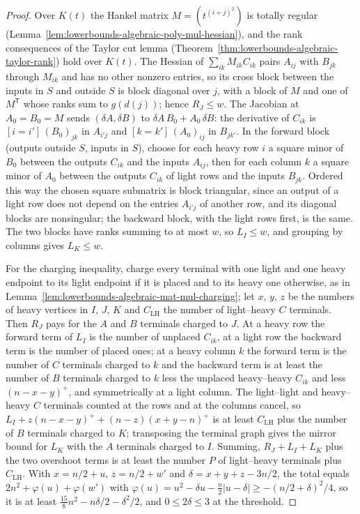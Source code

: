 \begin{proof}
  \leanok
  Over $K(t)$ the Hankel matrix $M=(t^{(i+j)^2})$ is totally regular
  (Lemma~\ref{lem:lowerbounds-algebraic-poly-mul-hessian}), and the rank
  consequences of the Taylor cut lemma
  (Theorem~\ref{thm:lowerbounds-algebraic-taylor-rank}) hold over $K(t)$.
  The Hessian of $\sum_{ik}M_{ik}C_{ik}$ pairs $A_{ij}$ with $B_{jk}$ through
  $M_{ik}$ and has no other nonzero entries, so its cross block between the
  inputs in $S$ and outside $S$ is block diagonal over $j$, with a block of
  $M$ and one of $M^{\mathsf T}$ whose ranks sum to $g(d(j))$; hence
  $R_J\le w$. The Jacobian at $A_0=B_0=M$ sends $(\delta A,\delta B)$ to
  $\delta A\,B_0+A_0\,\delta B$: the derivative of $C_{ik}$ is
  $[i=i']\,(B_0)_{jk}$ in $A_{i'j}$ and $[k=k']\,(A_0)_{ij}$ in $B_{jk'}$.
  In the forward block (outputs outside $S$, inputs in $S$), choose for each
  heavy row $i$ a square minor of $B_0$ between the outputs $C_{ik}$ and the
  inputs $A_{ij}$, then for each column $k$ a square minor of $A_0$ between
  the outputs $C_{ik}$ of light rows and the inputs $B_{jk}$. Ordered this
  way the chosen square submatrix is block triangular, since an output of a
  light row does not depend on the entries $A_{i'j}$ of another row, and its
  diagonal blocks are nonsingular; the backward block, with the light rows
  first, is the same. The two blocks have ranks summing to at most $w$, so
  $L_I\le w$, and grouping by columns gives $L_K\le w$.

  For the charging inequality, charge every terminal with one light and one
  heavy endpoint to its light endpoint if it is placed and to its heavy one
  otherwise, as in Lemma~\ref{lem:lowerbounds-algebraic-mat-mul-charging};
  let $x$, $y$, $z$ be the numbers of heavy vertices in $I$, $J$, $K$ and
  $C_{\mathrm{LH}}$ the number of light--heavy $C$ terminals. Then $R_J$ pays
  for the $A$ and $B$ terminals charged to $J$. At a heavy row the forward
  term of $L_I$ is the number of unplaced $C_{ik}$, at a light row the
  backward term is the number of placed ones; at a heavy column $k$ the
  forward term is the number of $C$ terminals charged to $k$ and the backward
  term is at least the number of $B$ terminals charged to $k$ less the
  unplaced heavy--heavy $C_{ik}$ and less $(n-x-y)^+$, and symmetrically at a
  light column. The light--light and heavy--heavy $C$ terminals counted at
  the rows and at the columns cancel, so
  $L_I+z(n-x-y)^++(n-z)(x+y-n)^+$ is at least $C_{\mathrm{LH}}$ plus the
  number of $B$ terminals charged to $K$; transposing the terminal graph
  gives the mirror bound for $L_K$ with the $A$ terminals charged to $I$.
  Summing, $R_J+L_I+L_K$ plus the two overshoot terms is at least the number
  $P$ of light--heavy terminals plus $C_{\mathrm{LH}}$. With
  $x=n/2+u$, $z=n/2+w'$ and $\delta=x+y+z-3n/2$, the total equals
  $2n^2+\varphi(u)+\varphi(w')$ with
  $\varphi(u)=u^2-\delta u-\tfrac n2|u-\delta|\ge-(n/2+\delta)^2/4$, so it is
  at least $\tfrac{15}8n^2-n\delta/2-\delta^2/2$, and $0\le2\delta\le3$ at the
  threshold.


\end{proof}
